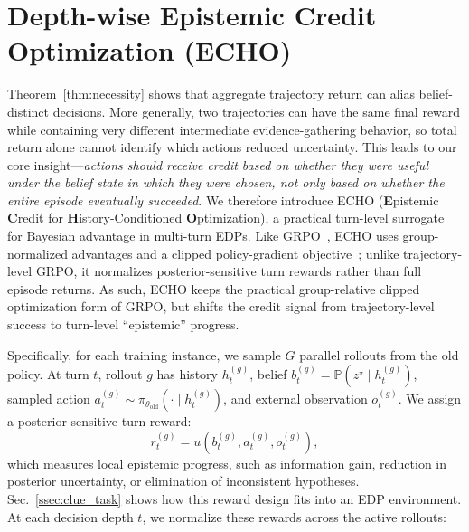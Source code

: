 \documentclass[11pt]{article}
\theoremstyle{plain}
\theoremstyle{definition}
\theoremstyle{remark}
\begin{document}
\vspace*{-3mm}
\section{Depth-wise Epistemic Credit Optimization (\textsc{ECHO})}
\label{sec:echo}
\vspace*{-3mm}
Theorem~\ref{thm:necessity} shows that aggregate trajectory return can alias belief-distinct decisions. More generally, two trajectories can have the same final reward while containing very different intermediate evidence-gathering behavior, so total return alone cannot identify which actions reduced uncertainty. This leads to our core insight—\textit{actions should receive credit based on whether they were useful under the belief state in which they were chosen, not only based on whether the entire episode eventually succeeded}. We therefore introduce \textsc{ECHO} (\textbf{E}pistemic \textbf{C}redit for \textbf{H}istory-Conditioned \textbf{O}ptimization), a practical turn-level surrogate for Bayesian advantage in multi-turn EDPs. Like GRPO~\citep{shao2024deepseekmath}, \textsc{ECHO} uses group-normalized advantages and a clipped policy-gradient objective~\citep{schulman2017proximalpolicyoptimizationalgorithms}; unlike trajectory-level GRPO, it normalizes posterior-sensitive turn rewards rather than full episode returns. As such, \textsc{ECHO} keeps the practical group-relative clipped optimization form of GRPO, but shifts the credit signal from trajectory-level success to turn-level “epistemic” progress. 


Specifically, for each training instance, we sample \(G\) parallel rollouts from the old policy. At turn \(t\), rollout \(g\) has history \(h_t^{(g)}\), belief \(b_t^{(g)}=\mathbb{P}(z^\star\mid h_t^{(g)})\), sampled action \(a_t^{(g)}\sim\pi_{\theta_{\mathrm{old}}}(\cdot\mid h_t^{(g)})\), and external observation \(o_t^{(g)}\). We assign a posterior-sensitive turn reward:
\[
    r_t^{(g)}
    =
    u\!\left(b_t^{(g)},a_t^{(g)},o_t^{(g)}\right),
\]
which measures local epistemic progress, such as information gain, reduction in posterior uncertainty, or elimination of inconsistent hypotheses. Sec.~\ref{ssec:clue_task} shows how this reward design fits into an EDP environment. At each decision depth \(t\), we normalize these rewards across the active rollouts: 
\end{document}
